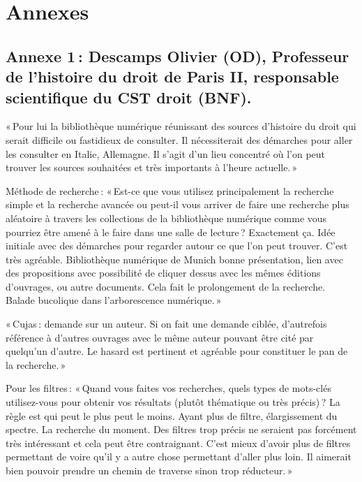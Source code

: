 \section*{Annexes} 

\subsection*{Annexe 1 : Descamps Olivier (OD), Professeur de l’histoire du droit de Paris II, responsable scientifique du CST droit (BNF).}  

« Pour lui la bibliothèque numérique réunissant des sources d’histoire du droit qui serait difficile ou fastidieux de consulter. Il nécessiterait des démarches pour aller les consulter en Italie, Allemagne. Il s’agit d’un lieu concentré où l’on peut trouver les sources souhaitées et très importants à l’heure actuelle. » 

Méthode de recherche : « Est-ce que vous utilisez principalement la recherche simple et la recherche avancée ou peut-il vous arriver de faire une recherche plus aléatoire à travers les collections de la bibliothèque numérique comme vous pourriez être amené à le faire dans une salle de lecture ? Exactement ça. Idée initiale avec des démarches pour regarder autour ce que l’on peut trouver. C’est très agréable. Bibliothèque numérique de Munich bonne présentation, lien avec des propositions avec possibilité de cliquer dessus avec les mêmes éditions d’ouvrages, ou autre documents. Cela fait le prolongement de la recherche. Balade bucolique dans l’arborescence numérique. »  

« Cujas : demande sur un auteur. Si on fait une demande ciblée, d’autrefois référence à d’autres ouvrages avec le même auteur pouvant être cité par quelqu’un d’autre. Le hasard est pertinent et agréable pour constituer le pan de la recherche. » 

Pour les filtres : « Quand vous faites vos recherches, quels types de mots-clés utilisez-vous pour obtenir vos résultats (plutôt thématique ou très précis) ? La règle est qui peut le plus peut le moins. Ayant plus de filtre, élargissement du spectre. La recherche du moment. Des filtres trop précis ne seraient pas forcément très intéressant et cela peut être contraignant. C’est mieux d’avoir plus de filtres permettant de voire qu’il y a autre chose permettant d’aller plus loin. Il aimerait bien pouvoir prendre un chemin de traverse sinon trop réducteur. » 

